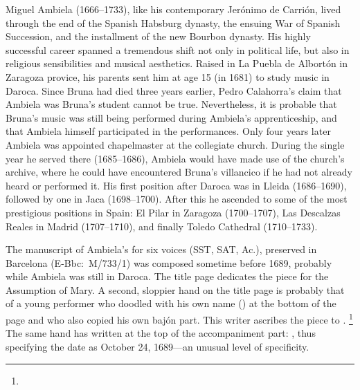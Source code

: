 % 	

Miguel Ambiela (1666--1733), like his contemporary Jerónimo de Carrión, lived through the end of the Spanish Habsburg dynasty, the ensuing War of Spanish Succession, and the installment of the new Bourbon dynasty.
His highly successful career spanned a tremendous shift not only in political life, but also in religious sensibilities and musical aesthetics.
Raised in La Puebla de Albortón in Zaragoza provice, his parents sent him at age 15 (in 1681) to study music in Daroca.
Since Bruna had died three years earlier, Pedro Calahorra's claim that Ambiela was Bruna's student cannot be true.
Nevertheless, it is probable that Bruna's music was still being performed during Ambiela's apprenticeship, and that Ambiela himself participated in the performances.
Only four years later Ambiela was appointed chapelmaster at the collegiate church.
During the single year he served there (1685--1686), Ambiela would have made use of the church's archive, where he could have encountered Bruna's villancico if he had not already heard or performed it. 
His first position after Daroca was in Lleida (1686--1690), followed by one in Jaca (1698--1700).
After this he ascended to some of the most prestigious positions in Spain: El Pilar in Zaragoza (1700--1707), Las Descalzas Reales in Madrid (1707--1710), and finally Toledo Cathedral (1710--1733).%
	\autocites[1]{Calahorra:Suban}[]{Grove}{Alvarez:Ambiela}

The manuscript of Ambiela's  for six voices (SST, SAT, Ac.), preserved in Barcelona (E-Bbc:~M/733/1) was composed sometime before 1689, probably while Ambiela was still in Daroca.
The title page dedicates the piece for the Assumption of Mary.
A second, sloppier hand on the title page is probably that of a young performer who doodled with his own name () at the bottom of the page and who also copied his own bajón part.
This writer ascribes the piece to .%
	\footnote{%
	}
The same hand has written at the top of the accompaniment part:  , thus specifying the date as October 24, 1689---an unusual level of specificity.

